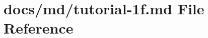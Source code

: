 \hypertarget{tutorial-1f_8md}{}\section{docs/md/tutorial-\/1f.md File Reference}
\label{tutorial-1f_8md}
